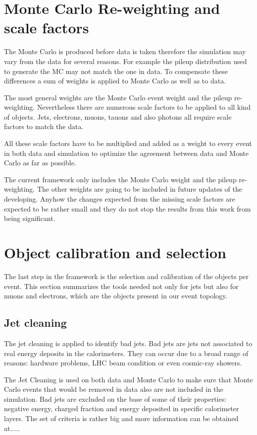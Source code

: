\section{Monte Carlo Re-weighting and scale factors}

The Monte Carlo is produced before data is taken therefore the simulation may vary from the data for several reasons. For example the pileup distribution used to generate the MC may not match the one in data. To compensate these differences a sum of weights is applied to Monte Carlo as well as to data.

The most general weights are the Monte Carlo event weight and the pileup re-weighting. Nevertheless there are numerous scale factors to be applied to all kind of objects. Jets, electrons, muons, tauons and also photons all require scale factors to match the data. 

All these scale factors have to be multiplied and added as a weight to every event in both data and simulation to optimize the agreement between data and Monte Carlo as far as possible.

The current framework only includes the Monte Carlo weight and the pileup re-weighting. The other weights are going to be included in future updates of the developing. Anyhow the changes expected from the missing scale factors are expected to be rather small and they do not stop the results from this work from being significant.

\section{Object calibration and selection}

The last step in the framework is the selection and calibration of the objects per event. This section summarizes the tools needed not only for jets but also for muons and electrons, which are the objects present in our event topology.

\subsection{Jet cleaning}

The jet cleaning is applied to identify bad jets. Bad jets are jets not associated to real energy deposits in the calorimeters. They can occur due to a broad range of reasons: hardware problems, LHC beam condition or even cosmic-ray showers.

The Jet Cleaning is used on both data and Monte Carlo to make sure that Monte Carlo events that would be removed in data also are not included in the simulation.
Bad jets are excluded on the base of some of their properties: negative energy, charged fraction and energy deposited in specific calorimeter layers. The set of criteria is rather big and more information can be obtained at.....


